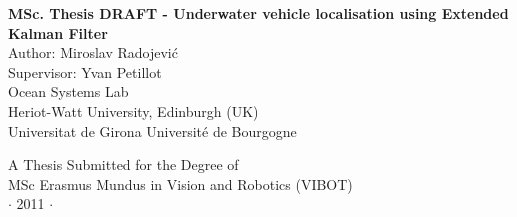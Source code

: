 
\newpage
\thispagestyle{empty}


\vspace*{2cm}
\begin{center}
{\Large\bf MSc. Thesis DRAFT - Underwater vehicle localisation using Extended Kalman Filter\\} \vspace{2cm} {\large
Author: Miroslav Radojevi\'c \\
Supervisor: Yvan Petillot    \\
\vspace{2cm}
Ocean Systems Lab \\
Heriot-Watt University, Edinburgh (UK) \\
Universitat de Girona \;
Universit\'{e} de Bourgogne  
}

\end{center}

\vspace{7cm}
\begin{center}
{\large A Thesis Submitted for the Degree of \\MSc Erasmus Mundus
in Vision and Robotics (VIBOT) \\\vspace{0.3cm} $\cdot$ 2011
$\cdot$}
\end{center}
\singlespacing



